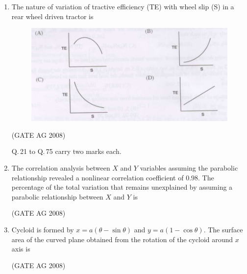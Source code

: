 \documentclass[journal]{IEEEtran}
\begin{document}
\begin{enumerate}
\item
 The nature of variation of tractive efficiency (TE) with wheel slip (S) in a rear wheel driven tractor is \\
\begin{figure}[h]
    \centering
    \includegraphics[width=0.7\columnwidth]{Figs/Screenshot 2025-08-07 170331.png}
    \caption{}
    \label{fig 1}
\end{figure}
\hfill(GATE AG 2008)


\medskip


Q.\,21 to Q.\,75 carry two marks each.

\bigskip

\item 
 The correlation analysis between $X$ and $Y$ variables assuming the parabolic relationship revealed a nonlinear correlation coefficient of $0.98$. The percentage of the total variation that remains unexplained by assuming a parabolic relationship between $X$ and $Y$ is
\begin{enumerate}
\end{enumerate}
\hfill(GATE AG 2008)\\

\medskip

\item 
  Cycloid is formed by $x = a(\theta-\sin\theta)$ and $y = a(1-\cos\theta)$. The surface area of the curved plane obtained from the rotation of the cycloid around $x$ axis is
\begin{enumerate}
\end{enumerate}
\hfill(GATE AG 2008)\\


\end{enumerate}
\end{document}
